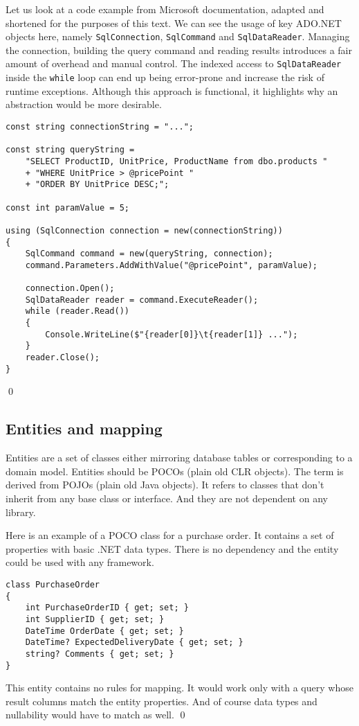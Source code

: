 \begin{example}
Let us look at a code example from Microsoft documentation\cite{ADONET}, adapted and shortened for the purposes of this text.
We can see the usage of key ADO.NET objects here, namely \texttt{SqlConnection}, \texttt{SqlCommand} and \texttt{SqlDataReader}. Managing the connection, building the query command and reading results introduces a fair amount of overhead and manual control. The indexed access to \texttt{SqlDataReader} inside the \texttt{while} loop can end up being error-prone and increase the risk of runtime exceptions. Although this approach is functional, it highlights why an abstraction would be more desirable.

\begin{lstlisting}[language=CSharp]
const string connectionString = "...";

const string queryString =
    "SELECT ProductID, UnitPrice, ProductName from dbo.products "
    + "WHERE UnitPrice > @pricePoint "
    + "ORDER BY UnitPrice DESC;";

const int paramValue = 5;

using (SqlConnection connection = new(connectionString))
{
    SqlCommand command = new(queryString, connection);
    command.Parameters.AddWithValue("@pricePoint", paramValue);

    connection.Open();
    SqlDataReader reader = command.ExecuteReader();
    while (reader.Read())
    {
        Console.WriteLine($"{reader[0]}\t{reader[1]} ...");
    }
    reader.Close();
}
\end{lstlisting}
\qed
\end{example}

\subsection{Entities and mapping}
Entities are a set of classes either mirroring database tables or corresponding to a domain model. Entities should be POCOs (plain old CLR objects). The term is derived from POJOs (plain old Java objects). It refers to classes that don't inherit from any base class or interface. And they are not dependent on any library. \cite{Fowler2003POJO}

\begin{example}
Here is an example of a POCO class for a purchase order. It contains a set of properties with basic .NET data types. There is no dependency and the entity could be used with any framework.
\begin{lstlisting}[language=CSharp]
class PurchaseOrder
{
    int PurchaseOrderID { get; set; }
    int SupplierID { get; set; }
    DateTime OrderDate { get; set; }
    DateTime? ExpectedDeliveryDate { get; set; }
    string? Comments { get; set; }
}
\end{lstlisting}
This entity contains no rules for mapping. It would work only with a query whose result columns match the entity properties. And of course data types and nullability would have to match as well.
\qed
\end{example}

